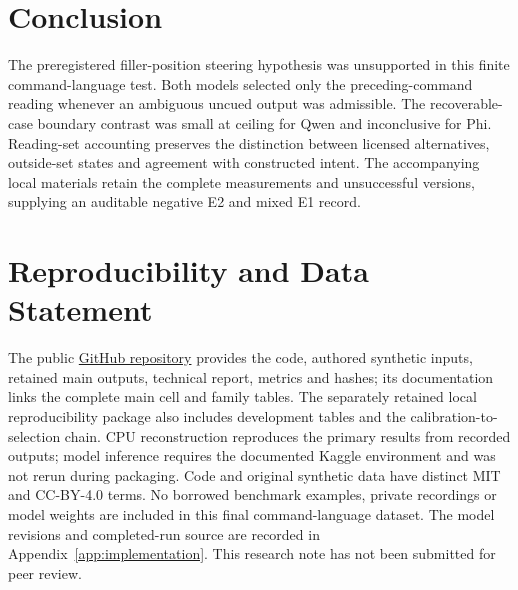 \documentclass[11pt]{article}
\begin{document}
\section{Conclusion}
The preregistered filler-position steering hypothesis was unsupported in this finite command-language test. Both models selected only the preceding-command reading whenever an ambiguous uncued output was admissible. The recoverable-case boundary contrast was small at ceiling for Qwen and inconclusive for Phi. Reading-set accounting preserves the distinction between licensed alternatives, outside-set states and agreement with constructed intent. The accompanying local materials retain the complete measurements and unsuccessful versions, supplying an auditable negative E2 and mixed E1 record.

\section*{Reproducibility and Data Statement}
The public \href{https://github.com/ickma2311/transcript-command-diagnostics}{GitHub repository} provides the code, authored synthetic inputs, retained main outputs, technical report, metrics and hashes; its documentation links the complete main cell and family tables. The separately retained local reproducibility package also includes development tables and the calibration-to-selection chain. CPU reconstruction reproduces the primary results from recorded outputs; model inference requires the documented Kaggle environment and was not rerun during packaging. Code and original synthetic data have distinct MIT and CC-BY-4.0 terms. No borrowed benchmark examples, private recordings or model weights are included in this final command-language dataset. The model revisions and completed-run source are recorded in Appendix~\ref{app:implementation}. This research note has not been submitted for peer review.
\end{document}
